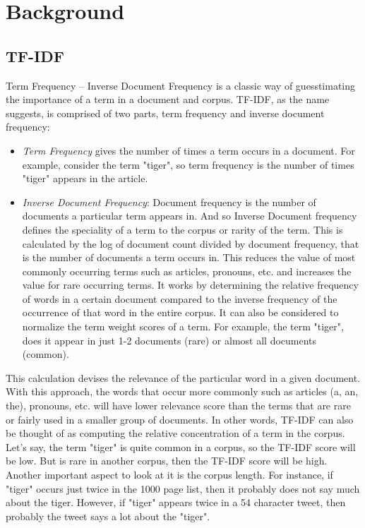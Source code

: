 \chapter{Background}

\section{TF-IDF}

Term Frequency – Inverse Document Frequency is a classic way of guesstimating the importance of a term in a document and corpus. TF-IDF, as the name suggests, is comprised of two parts, term frequency and inverse document frequency: 
\begin{itemize}
    \item \textit{Term Frequency} gives the number of times a term occurs in a document. For example, consider the term "tiger", so term frequency is the number of times "tiger" appears in the article.
    \item \textit{Inverse Document Frequency}: Document frequency is the number of documents a particular term appears in. And so Inverse Document frequency defines the speciality of a term to the corpus or rarity of the term. This is calculated by the log of document count divided by document frequency, that is the number of documents a term occurs in. This reduces the value of most commonly occurring terms such as articles, pronouns, etc. and increases the value for rare occurring terms. It works by determining the relative frequency of words in a certain document compared to the inverse frequency of the occurrence of that word in the entire corpus. It can also be considered to normalize the term weight scores of a term. For example, the term "tiger", does it appear in just 1-2 documents (rare) or almost all documents (common). 
\end{itemize}
This calculation devises the relevance of the particular word in a given document. With this approach, the words that occur more commonly such as articles (a, an, the), pronouns, etc. will have lower relevance score than the terms that are rare or fairly used in a smaller group of documents. In other words, TF-IDF can also be thought of as computing the relative concentration of a term in the corpus. Let's say, the term "tiger" is quite common in a corpus, so the TF-IDF score will be low. But is rare in another corpus, then the TF-IDF score will be high. 
Another important aspect to look at it is the corpus length. For instance, if "tiger" occurs just twice in the 1000 page list, then it probably does not say much about the tiger. However, if "tiger" appears twice in a 54 character tweet, then probably the tweet says a lot about the "tiger".

